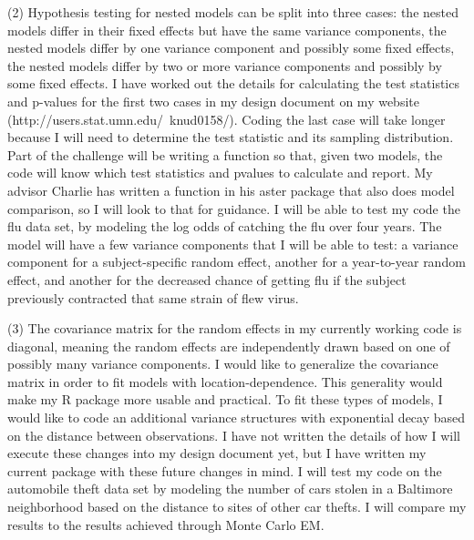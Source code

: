 \documentclass[12pt]{article}
\begin{document}
(2)  Hypothesis testing for nested models can be split into three cases: the nested models differ in their fixed effects but have the same variance components, the nested models differ by one variance component and possibly some fixed effects, the nested models differ by two or more variance components and possibly by some fixed effects. I have worked out the details for calculating the test statistics and p-values for the first two cases in my design document on my website (http://users.stat.umn.edu/~knud0158/). Coding the last case will take longer because I will need to determine the test statistic and its sampling distribution. Part of the challenge will be writing a function so that, given two models, the code will know which test statistics and pvalues to calculate and report. My advisor Charlie has written a function in his aster package that also does model comparison, so I will look to that for guidance.  I will be able to test my code  the \citet{coull:agresti:2000} flu data set, by modeling the log odds of catching the flu over four years. The model will have a few variance components that I will be able to test: a variance component for a subject-specific random effect, another for a year-to-year random effect, and another for the decreased chance of getting flu if the subject previously contracted that same strain of flew virus.

(3) The covariance matrix for the random effects in my currently working code is diagonal, meaning the random effects are independently drawn based on one of possibly many variance components.  I would like to generalize the covariance matrix in order to fit models with location-dependence.  This generality would make my R package more usable and practical.  To fit these types of models, I would like to code an additional variance structures with  exponential decay based on the distance between observations. I have not written the details of how I will execute these changes into my design document yet, but I have written my current package with these future changes in mind. I will test my code on the \citet{caffojj:2005} automobile theft data set by modeling the number of cars stolen in a Baltimore neighborhood based on the distance to sites of other car thefts.  I will compare my results to the results achieved through Monte Carlo EM. 
\end{document}
